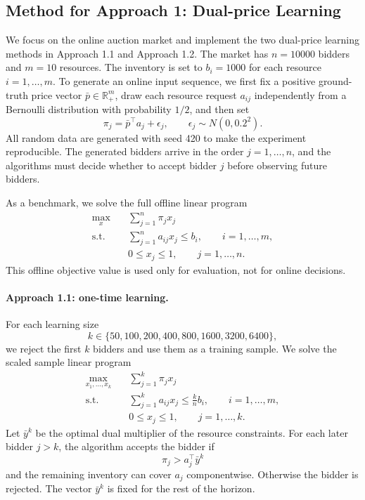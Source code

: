 \subsection{Method for Approach 1: Dual-price Learning}

We focus on the online auction market and implement the two dual-price learning
methods in Approach 1.1 and Approach 1.2.  The market has $n=10000$ bidders and
$m=10$ resources.  The inventory is set to $b_i=1000$ for each resource
$i=1,\ldots,m$.  To generate an online input sequence, we first fix a positive
ground-truth price vector $\bar p\in\mathbb{R}^m_+$, draw each resource request
$a_{ij}$ independently from a Bernoulli distribution with probability $1/2$, and
then set
\[
    \pi_j = \bar p^\top a_j + \epsilon_j,
    \qquad \epsilon_j\sim N(0, 0.2^2).
\]
All random data are generated with seed 420 to make the experiment reproducible.
The generated bidders arrive in the order $j=1,\ldots,n$, and the algorithms
must decide whether to accept bidder $j$ before observing future bidders.

As a benchmark, we solve the full offline linear program
\[
\begin{aligned}
    \max_x \quad & \sum_{j=1}^n \pi_j x_j \\
    \text{s.t.}\quad
        & \sum_{j=1}^n a_{ij}x_j \le b_i,\qquad i=1,\ldots,m,\\
        & 0\le x_j\le 1,\qquad j=1,\ldots,n.
\end{aligned}
\]
This offline objective value is used only for evaluation, not for online
decisions.

\paragraph{Approach 1.1: one-time learning.}
For each learning size
\[
    k\in\{50,100,200,400,800,1600,3200,6400\},
\]
we reject the first $k$ bidders and use them as a training sample.  We solve the
scaled sample linear program
\[
\begin{aligned}
    \max_{x_1,\ldots,x_k}\quad
        & \sum_{j=1}^k \pi_j x_j\\
    \text{s.t.}\quad
        & \sum_{j=1}^k a_{ij}x_j \le \frac{k}{n}b_i,
          \qquad i=1,\ldots,m,\\
        & 0\le x_j\le 1,\qquad j=1,\ldots,k.
\end{aligned}
\]
Let $\bar y^k$ be the optimal dual multiplier of the resource constraints.  For
each later bidder $j>k$, the algorithm accepts the bidder if
\[
    \pi_j > a_j^\top \bar y^k
\]
and the remaining inventory can cover $a_j$ componentwise.  Otherwise the bidder
is rejected.  The vector $\bar y^k$ is fixed for the rest of the horizon.

